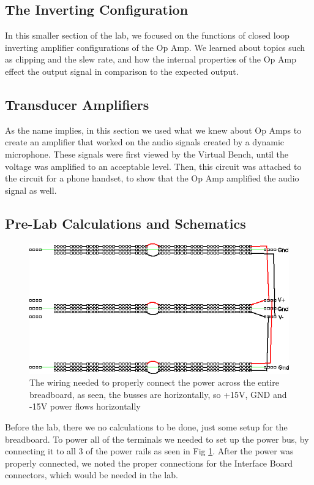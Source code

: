 \documentclass[10pt]{article}
\begin{document}
\subsection{The Inverting Configuration}
In this smaller section of the lab, we focused on the functions of closed loop inverting amplifier configurations of the Op Amp. We learned about topics such as clipping and the slew rate, and how the internal properties of the Op Amp effect the output signal in comparison to the expected output.
\subsection{Transducer Amplifiers}
As the name implies, in this section we used what we knew about Op Amps to create an amplifier that worked on the audio signals created by a dynamic microphone. These signals were first viewed by the Virtual Bench, until the voltage was amplified to an acceptable level. Then, this circuit was attached to the circuit for a phone handset, to show that the Op Amp amplified the audio signal as well. 

\subsection{Pre-Lab Calculations and Schematics}

\begin{centering}
	\begin{figure} [H]
		\centering
		\includegraphics[scale=0.65]{images/Breadboard.png}
		\caption{The wiring needed to properly connect the power across the entire breadboard, as seen, the busses are horizontally, so +15V, GND and -15V power flows horizontally}			
		\label{fig: Breadboard}
	\end{figure}
\end{centering}

Before the lab, there we no calculations to be done, just some setup for the breadboard. To power all of the terminals we needed to set up the power bus, by connecting it to all 3 of the power rails as seen in Fig \ref{fig: Breadboard}. After the power was properly connected, we noted the proper connections for the Interface Board connectors, which would be needed in the lab.
\end{document}
